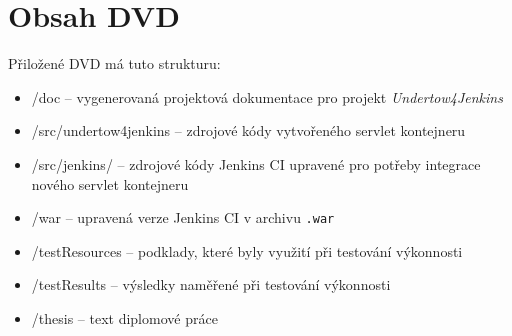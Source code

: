 
\chapter{Obsah DVD}
    Přiložené DVD má tuto strukturu:
    \begin{itemize}
        \item /doc -- vygenerovaná projektová dokumentace pro projekt \emph{Undertow4Jenkins}
        \item /src/undertow4jenkins -- zdrojové kódy vytvořeného servlet kontejneru
        \item /src/jenkins/ -- zdrojové kódy Jenkins CI upravené pro potřeby integrace nového servlet kontejneru
        \item /war -- upravená verze Jenkins CI v archivu \texttt{.war} 
        \item /testResources -- podklady, které byly využití při testování výkonnosti
        \item /testResults -- výsledky naměřené při testování výkonnosti
        \item /thesis -- text diplomové práce
    \end{itemize}







